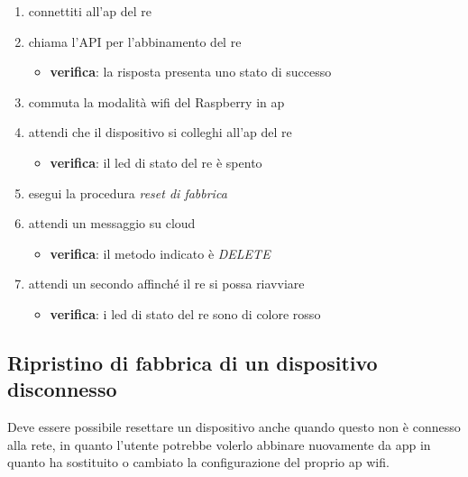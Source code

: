 \documentclass[12pt,a4paper,twoside,titlepage]{book}
\begin{document}
\begin{enumerate}
    \item connettiti all'\acrshort{ap} del \acrshort{re}
    \item chiama l'API per l'abbinamento del \acrshort{re} 
    \begin{itemize}
        \item \textbf{verifica}: la risposta presenta uno stato di successo 
    \end{itemize}
    \item commuta la modalità \Gls{wifi} del Raspberry in \acrshort{ap}
    \item attendi che il dispositivo si colleghi all'\acrshort{ap} del \acrshort{re}
    \begin{itemize}
        \item \textbf{verifica}: il  \acrshort{led} di stato del \acrshort{re} è spento 
    \end{itemize}
    \item esegui la procedura \textit{reset di fabbrica}
    \item attendi un messaggio su cloud
    \begin{itemize}
        \item \textbf{verifica}: il metodo indicato è \textit{DELETE}
    \end{itemize}
    \item attendi un secondo affinché il \acrshort{re} si possa riavviare
    \begin{itemize}
        \item \textbf{verifica}: i  \acrshort{led} di stato del \acrshort{re} sono di colore rosso
    \end{itemize}
\end{enumerate}

\subsection{Ripristino di fabbrica di un dispositivo disconnesso}
\label{section:test_factory_reset_unbounded}

Deve essere possibile resettare un dispositivo anche quando questo non è connesso
alla rete, in quanto l'utente potrebbe volerlo abbinare nuovamente da app in quanto ha sostituito
o cambiato la configurazione del proprio \acrshort{ap} \Gls{wifi}.
\end{document}
